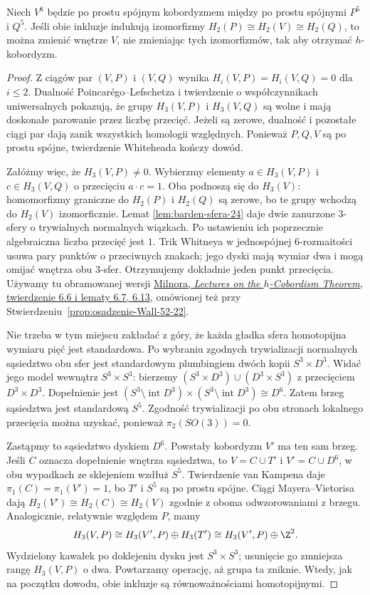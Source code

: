\begin{lemat}
\label{lem:barden-usuniecie-24}
Niech $V^6$ będzie po prostu spójnym
kobordyzmem między po prostu spójnymi
$P^5$ i $Q^5$. Jeśli obie inkluzje
indukują izomorfizmy
$H_2(P)\cong H_2(V)\cong H_2(Q)$,
to można zmienić wnętrze $V$, nie
zmieniając tych izomorfizmów, tak aby
otrzymać $h$-kobordyzm.
\end{lemat}
\begin{proof}
Z ciągów par $(V,P)$ i $(V,Q)$
wynika $H_i(V,P)=H_i(V,Q)=0$
dla $i\leq2$. Dualność
Poincarégo--Lefschetza i twierdzenie
o współczynnikach uniwersalnych
pokazują, że grupy
$H_3(V,P)$ i $H_3(V,Q)$ są wolne
i mają doskonałe parowanie przez
liczbę przecięć. Jeżeli są zerowe,
dualność i pozostałe ciągi par dają
zanik wszystkich homologii względnych.
Ponieważ $P,Q,V$ są po prostu spójne,
twierdzenie Whiteheada kończy dowód.

Załóżmy więc, że $H_3(V,P)\ne0$.
Wybierzmy elementy
$a\in H_3(V,P)$ i $c\in H_3(V,Q)$
o przecięciu $a\cdot c=1$.
Oba podnoszą się do $H_3(V)$:
homomorfizmy graniczne do
$H_2(P)$ i $H_2(Q)$ są zerowe,
bo te grupy wchodzą do $H_2(V)$
izomorficznie. Lemat
\ref{lem:barden-sfera-24} daje
dwie zanurzone $3$-sfery o
trywialnych normalnych wiązkach.
Po ustawieniu ich poprzecznie
algebraiczna liczba przecięć jest $1$.
Trik Whitneya w jednospójnej
$6$-rozmaitości usuwa pary punktów
o przeciwnych znakach; jego dyski
mają wymiar dwa i mogą omijać wnętrza
obu $3$-sfer. Otrzymujemy dokładnie
jeden punkt przecięcia.
Używamy tu obramowanej wersji
\href{https://webhomes.maths.ed.ac.uk/~v1ranick/surgery/hcobord.pdf}
{Milnora, \emph{Lectures on the $h$-Cobordism
Theorem}, twierdzenie 6.6 i lematy 6.7, 6.13},
omówionej też przy
Stwierdzeniu~\ref{prop:osadzenie-Wall-52-22}.

Nie trzeba w tym miejscu zakładać
z góry, że każda gładka sfera
homotopijna wymiaru pięć jest standardowa.
Po wybraniu zgodnych trywializacji
normalnych sąsiedztwo obu sfer
jest standardowym plumbingiem
dwóch kopii $S^3\times D^3$.
Widać jego model wewnątrz
$S^3\times S^3$: bierzemy
$(S^3\times D^3)\cup(D^3\times S^3)$
z przecięciem $D^3\times D^3$.
Dopełnienie jest
$(S^3\setminus\operatorname{int}D^3)
\times(S^3\setminus\operatorname{int}D^3)
\cong D^6$. Zatem brzeg sąsiedztwa
jest standardową $S^5$. Zgodność
trywializacji po obu stronach
lokalnego przecięcia można uzyskać,
ponieważ $\pi_2(SO(3))=0$.

Zastąpmy to sąsiedztwo dyskiem $D^6$.
Powstały kobordyzm $V'$ ma ten sam
brzeg. Jeśli $C$ oznacza dopełnienie
wnętrza sąsiedztwa, to $V=C\cup T'$
i $V'=C\cup D^6$, w obu wypadkach
ze sklejeniem wzdłuż $S^5$.
Twierdzenie van Kampena daje
$\pi_1(C)=\pi_1(V')=1$, bo
$T'$ i $S^5$ są po prostu spójne.
Ciągi Mayera--Vietorisa dają
$H_2(V')\cong H_2(C)\cong H_2(V)$
zgodnie z oboma odwzorowaniami
z brzegu. Analogicznie, relatywnie
względem $P$, mamy
\[
 H_3(V,P)\cong H_3(V',P)\oplus
 H_3(T')\cong H_3(V',P)\oplus\Z^2.
\]
Wydzielony kawałek po doklejeniu
dysku jest $S^3\times S^3$;
usunięcie go zmniejsza rangę
$H_3(V,P)$ o dwa. Powtarzamy operację,
aż grupa ta zniknie. Wtedy, jak
na początku dowodu, obie inkluzje
są równoważnościami homotopijnymi.
\end{proof}

